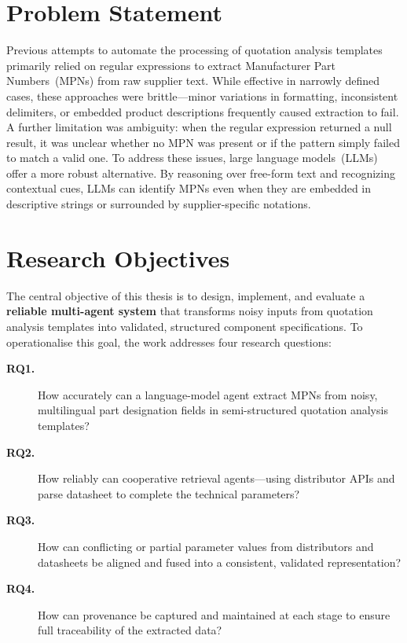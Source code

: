 \section{Problem Statement }
Previous attempts to automate the processing of quotation analysis templates primarily relied on regular expressions to extract Manufacturer Part Numbers~(MPNs) from raw supplier text.  
While effective in narrowly defined cases, these approaches were brittle---minor variations in formatting, inconsistent delimiters, or embedded product descriptions frequently caused extraction to fail.  
A further limitation was ambiguity: when the regular expression returned a null result, it was unclear whether no MPN was present or if the pattern simply failed to match a valid one.  
To address these issues, large language models~(LLMs) offer a more robust alternative.  
By reasoning over free-form text and recognizing contextual cues, LLMs can identify MPNs even when they are embedded in descriptive strings or surrounded by supplier-specific notations.

\section{Research Objectives }
The central objective of this thesis is to design, implement, and evaluate a \textbf{reliable multi-agent system} that transforms noisy inputs from quotation analysis templates into validated, structured component specifications.  
To operationalise this goal, the work addresses four research questions:

\begin{description}
\item[\textbf{RQ1.}] How accurately can a language-model agent extract MPNs from noisy, multilingual part designation fields in semi-structured quotation analysis templates?

\item[\textbf{RQ2.}] How reliably can cooperative retrieval agents—using distributor APIs and parse datasheet to complete the technical parameters? 

\item[\textbf{RQ3.}] How can conflicting or partial parameter values from distributors and datasheets be aligned and fused into a consistent, validated representation?

\item[\textbf{RQ4.}] How can provenance be captured and maintained at each stage to ensure full traceability of the extracted data?
\end{description}

